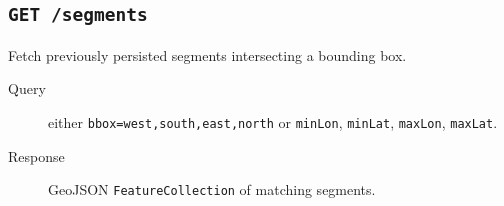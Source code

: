 \documentclass{article}
\begin{document}
\subsection{\texttt{GET /segments}}
Fetch previously persisted segments intersecting a bounding box.
\begin{description}
\item[Query] either \texttt{bbox=west,south,east,north} or \texttt{minLon}, \texttt{minLat}, \texttt{maxLon}, \texttt{maxLat}.
\item[Response] GeoJSON \texttt{FeatureCollection} of matching segments.
\end{description}
\end{document}
